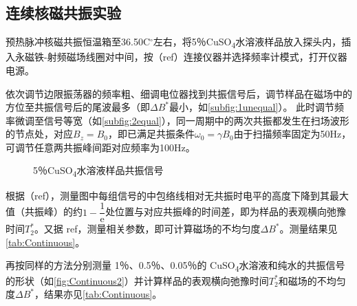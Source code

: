 \subsection{连续核磁共振实验} %
	\label{sub:连续核磁共振实验}
	\par 预热脉冲核磁共振恒温箱至36.50C$^{\circ}$左右，将5％CuSO\textsubscript{4}水溶液样品放入探头内，插入永磁铁-射频磁场线圈对中间，按（ref）连接仪器并选择频率计模式，打开仪器电源。\\
	\par 依次调节边限振荡器的频率粗、细调电位器找到共振信号后，调节样品在磁场中的方位至共振信号后的尾波最多（即$\Delta B^{*}$最小，如\cref{subfig:1unequal}）。
	此时调节频率微调至信号等宽（如\cref{subfig:2equal}），同一周期中的两次共振都发生在扫场波形的节点处，对应$B_z = B_0$，即已满足共振条件$\omega_0=\gamma B_0$由于扫描频率固定为50Hz，可调节任意两共振峰间距对应频率为100Hz。
	\begin{figure}
		\centering
		\hspace{1cm}
		\caption{5％CuSO\textsubscript{4}水溶液样品共振信号}\label{fig:Continuous1}
	\end{figure}
	根据（ref），测量图中每组信号的中包络线相对无共振时电平的高度下降到其最大值（共振峰）的约$1-\dfrac{1}{\mathrm{e}}$处位置与对应共振峰的时间差，即为样品的表观横向弛豫时间$T_2^*$。又据{\color{red} ref}，测量相关参数，即可计算磁场的不均匀度$\Delta B^*$。测量结果见\cref{tab:Continuous}。\\
	\par 再按同样的方法分别测量 1％、0.5％、0.05％的 CuSO\textsubscript{4}水溶液和纯水的共振信号的形状（如\cref{fig:Continuous2}）并计算样品的表观横向弛豫时间$T_2^*$和磁场的不均匀度$\Delta B^*$，结果亦见\cref{tab:Continuous}。\\
